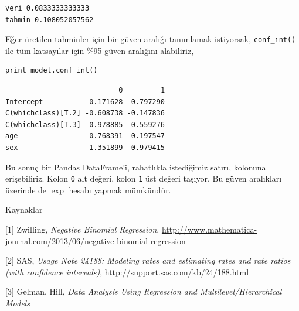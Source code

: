 \documentclass[12pt,fleqn]{article}\usepackage{../../common}
\begin{document}
\begin{verbatim}
veri 0.0833333333333
tahmin 0.108052057562
\end{verbatim}

Eğer üretilen tahminler için bir güven aralığı tanımlamak istiyorsak,
\verb!conf_ınt()! ile tüm katsayılar için \%95 güven aralığını alabiliriz,

\begin{verbatim}
print model.conf_int()
\end{verbatim}

\begin{verbatim}
                           0         1
Intercept           0.171628  0.797290
C(whichclass)[T.2] -0.608738 -0.147836
C(whichclass)[T.3] -0.978885 -0.559276
age                -0.768391 -0.197547
sex                -1.351899 -0.979415
\end{verbatim}

Bu sonuç bir Pandas DataFrame'i, rahatlıkla istediğimiz satırı, kolonuna
erişebiliriz. Kolon \verb!0! alt değeri, kolon \verb!1! üst değeri
taşıyor. Bu güven aralıkları üzerinde de $\exp$ hesabı yapmak mümkündür. 

Kaynaklar

[1] Zwilling, {\em Negative Binomial Regression}, \url{http://www.mathematica-journal.com/2013/06/negative-binomial-regression}

[2] SAS, {\em Usage Note 24188: Modeling rates and estimating rates and rate
  ratios (with confidence intervals)}, \url{http://support.sas.com/kb/24/188.html}

[3] Gelman, Hill, {\em Data Analysis Using Regression and Multilevel/Hierarchical Models}
\end{document}
